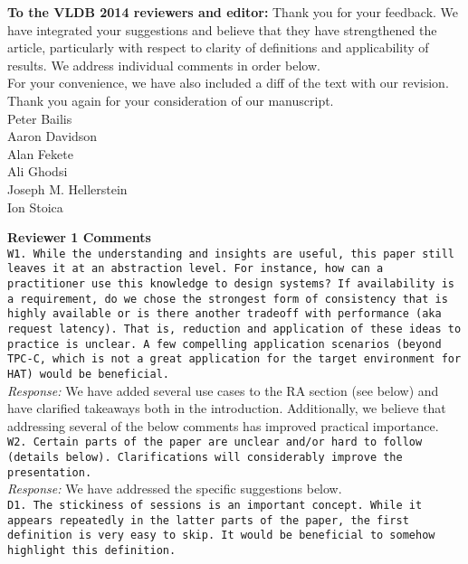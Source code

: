 \documentclass[10pt]{article}
\newcommand{\reviewer}[1] {\noindent\texttt{#1}\\}
\newcommand{\response}[1] {\noindent\textit{Response: } #1\\}
\begin{document}
\noindent\textbf{To the VLDB 2014 reviewers and editor:} Thank you for your
feedback. We have integrated your suggestions and believe that they
have strengthened the article, particularly with respect to clarity of
definitions and applicability of results. We address individual
comments in order below.\\

\noindent For your convenience, we have also included a diff of the text with our revision.\\

\noindent Thank you again for your consideration of our manuscript.\\

\noindent Peter Bailis\\
Aaron Davidson\\
Alan Fekete\\
Ali Ghodsi\\
Joseph M. Hellerstein\\
Ion Stoica

\newpage
\noindent\textbf{Reviewer 1 Comments}\\


\reviewer{W1. While the understanding and insights are useful, this paper still leaves it at an abstraction level. For instance, how can a practitioner use this knowledge to design systems? If availability is a requirement, do we chose the strongest form of consistency that is highly available or is there another tradeoff with performance (aka request latency). That is, reduction and application of these ideas to practice is unclear. A few compelling application scenarios (beyond TPC-C, which is not a great application for the target environment for HAT) would be beneficial.}

\response{We have added several use cases to the RA section (see below) and have
clarified takeaways both in the introduction. Additionally, we believe
that addressing several of the below comments has improved practical
importance.}

\reviewer{W2. Certain parts of the paper are unclear and/or hard to follow (details below). Clarifications will considerably improve the presentation.}

\response{We have addressed the specific suggestions below.}

\reviewer{D1. The stickiness of sessions is an important concept. While it appears repeatedly in the latter parts of the paper, the first definition is very easy to skip. It would be beneficial to somehow highlight this definition.}
\end{document}
